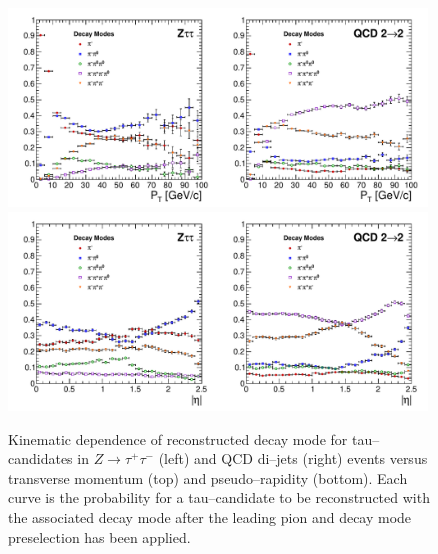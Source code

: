 \begin{figure}[thbp]
   \setlength{\unitlength}{1mm}
   \begin{center}
     \includegraphics*[width=0.99\textwidth]{tanc_chapter/figures/dmVsPt.pdf}
     \includegraphics*[width=0.99\textwidth]{tanc_chapter/figures/dmVsEta.pdf}
   \caption[Kinematic dependence of decay mode reconstruction]{Kinematic
   dependence of reconstructed decay mode for tau--candidates in 
   $Z\to\tau^{+}\tau^{-}$ (left) and QCD di--jets (right) events versus
   transverse momentum (top) and pseudo--rapidity (bottom).  Each curve is the
   probability for a tau--candidate to be reconstructed with the associated
   decay mode after the leading pion and decay mode preselection has been
   applied.  } \label{fig:dmKinematics}
   \end{center}
\end{figure}
